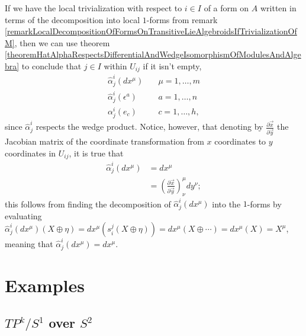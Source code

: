 \begin{remark}\label{remarkSufficesEnoughNeedOnlyHatAlphaFor1FormsToTranslateLocalTrivializations}
If we have the local trivialization with respect to $i \in I$ of a form on $A$ written in terms of the decomposition into local $1$-forms from remark \ref{remarkLocalDecompositionOfFormsOnTransitiveLieAlgebroidsIfTrivializationOfM}, then we can use theorem \ref{theoremHatAlphaRespectsDifferentialAndWedgeIsomorphismOfModulesAndAlgebra} to conclude that  $j \in I$ within $U_{ij}$ if it isn't empty,  
\begin{align}
    \hat \alpha^i_j(dx^\mu)& \quad \mu = 1, \dots, m \\ 
    \hat \alpha^i_j(\epsilon^a)& \quad a = 1, \dots, n \\
    \alpha^i_j(e_c)& \quad c = 1, \dots, h,
\end{align}
since $\hat \alpha^i_j$ respects the wedge product. Notice, however, that denoting by $\frac{\partial \vec x}{\partial \vec y}$ the Jacobian matrix of the coordinate transformation from $x$ coordinates to $y$ coordinates in $U_{ij}$, it is true that
\begin{align}
    \hat \alpha^i_j(dx^\mu) &= dx^\mu \\
    &= \left(\frac{\partial \vec x}{\partial \vec y}\right)^\mu_\nu dy^\nu;
\end{align}
this follows from finding the decomposition of $\hat \alpha^i_j(dx^\mu)$ into the $1$-forms by evaluating $\hat \alpha^i_j(dx^\mu)(X \oplus \eta) = dx^\mu(s^j_i(X \oplus \eta)) = dx^\mu(X \oplus \cdots) = dx^\mu(X) = X^\mu$, meaning that $\hat \alpha^i_j (dx^\mu) = dx^\mu$.
\end{remark}

\section{Examples}

\subsection{$TP^k/S^1$ over $S^2$} \label{exampleTransitionALphaFormsPk}


